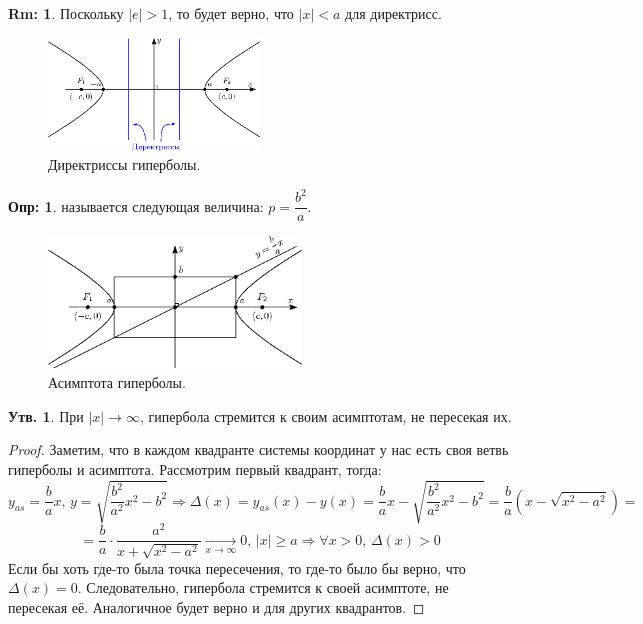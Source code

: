 \documentclass[12pt]{article}
\theoremstyle{definition}
\newtheorem{defn}{Опр:}
\newtheorem{rem}{Rm:}
\newtheorem{prop}{Утв.}
\begin{document}
\begin{rem}
	Поскольку $|e| > 1$, то будет верно, что $|x| < a$ для директрисс.
\end{rem}

\begin{figure}[H]
	\centering
	\includegraphics[width=0.5\textwidth]{ANGL3_3.eps}
	\caption{Директриссы гиперболы.}
	\label{3_3}
\end{figure}

\begin{defn}
	 называется следующая величина: $p = \dfrac{b^2}{a}$.
\end{defn}

\begin{figure}[H]
	\centering
	\includegraphics[width=0.6\textwidth]{ANGL3_4.eps}
	\caption{Асимптота гиперболы.}
	\label{3_4}
\end{figure}

\begin{prop}
	При $|x| \to \infty$, гипербола стремится к своим асимптотам, не пересекая их.
\end{prop}
\begin{proof}
	Заметим, что в каждом квадранте системы координат у нас есть своя ветвь гиперболы и асимптота. Рассмотрим первый квадрант, тогда:
	$$
		y_{as} = \dfrac{b}{a}x, \, y = \sqrt{\dfrac{b^2}{a^2}x^2 - b^2} \Rightarrow \Delta(x) = y_{as}(x) - y(x) = 	\dfrac{b}{a}x -  \sqrt{\dfrac{b^2}{a^2}x^2 - b^2} = \dfrac{b}{a}\left(x - \sqrt{x^2 - a^2}\right) = 
	$$
	$$
		= \dfrac{b}{a}{\cdot}\dfrac{a^2}{x + \sqrt{x^2 - a^2}} \xrightarrow[x \to \infty]{} 0, \, |x| \geq a \Rightarrow \forall x > 0, \, \Delta(x) > 0
	$$
	Если бы хоть где-то была точка пересечения, то где-то было бы верно, что $\Delta(x) = 0$. Следовательно, гипербола стремится к своей асимптоте, не пересекая её. Аналогичное будет верно и для других квадрантов.
\end{proof}
\end{document}
